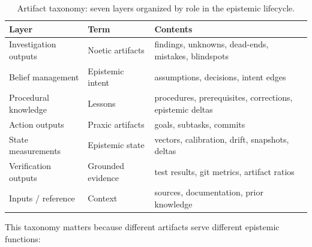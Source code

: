\begin{table}[h]
\centering
\begin{tabular}{lll}
\toprule
\textbf{Layer} & \textbf{Term} & \textbf{Contents} \\
\midrule
Investigation outputs & Noetic artifacts & findings, unknowns, dead-ends, mistakes, blindspots \\
Belief management & Epistemic intent & assumptions, decisions, intent edges \\
Procedural knowledge & Lessons & procedures, prerequisites, corrections, epistemic deltas \\
Action outputs & Praxic artifacts & goals, subtasks, commits \\
State measurements & Epistemic state & vectors, calibration, drift, snapshots, deltas \\
Verification outputs & Grounded evidence & test results, git metrics, artifact ratios \\
Inputs / reference & Context & sources, documentation, prior knowledge \\
\bottomrule
\end{tabular}
\caption{Artifact taxonomy: seven layers organized by role in the epistemic lifecycle.}
\label{tab:artifact-taxonomy}
\end{table}

This taxonomy matters because different artifacts serve different epistemic functions:

